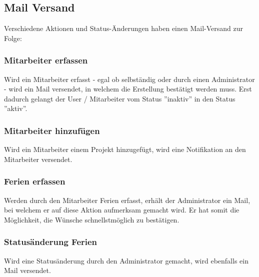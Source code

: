 \subsection{Mail Versand}
Verschiedene Aktionen und Status-\"Anderungen haben einen Mail-Versand zur Folge:
\subsubsection{Mitarbeiter erfassen}
Wird ein Mitarbeiter  erfasst - egal ob selbst\"andig oder durch einen Administrator - wird ein Mail versendet, in welchem die Erstellung best\"atigt werden muss. Erst dadurch gelangt der User / Mitarbeiter vom Status ''inaktiv'' in den Status ''aktiv''.

\subsubsection{Mitarbeiter hinzuf\"ugen}
Wird ein Mitarbeiter einem Projekt hinzugef\"ugt, wird eine Notifikation an den Mitarbeiter versendet.

\subsubsection{Ferien erfassen}
Werden durch den Mitarbeiter Ferien erfasst, erh\"alt der Administrator ein Mail, bei welchem er auf diese Aktion aufmerksam gemacht wird. Er hat somit die M\"oglichkeit, die W\"unsche schnellstm\"oglich zu best\"atigen.

\subsubsection{Status\"anderung Ferien}
Wird eine Status\"anderung durch den Administrator gemacht, wird ebenfalls ein Mail versendet.
